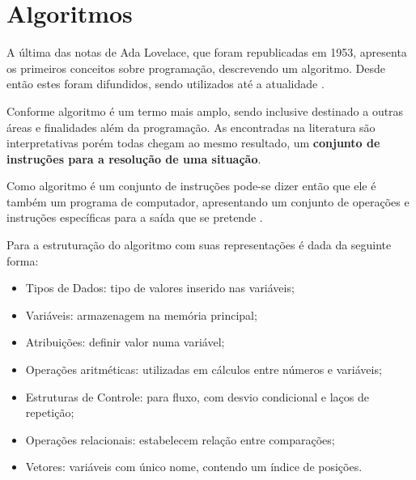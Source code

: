 \section{Algoritmos}

A última das notas de Ada Lovelace, que foram republicadas em 1953\nocite{1253887}, apresenta os
primeiros conceitos sobre programação, descrevendo um algoritmo. Desde então
estes foram difundidos, sendo utilizados até a atualidade
\cite{santiago2003etal}.

Conforme  algoritmo é um termo mais amplo, sendo inclusive destinado a outras áreas e finalidades além da programação. As encontradas na literatura são interpretativas porém todas chegam ao mesmo resultado, um {\bfseries conjunto de instruções para a resolução de uma situação}.

Como algoritmo é um conjunto de instruções pode-se dizer então que ele é também um programa de computador, apresentando um conjunto de operações e instruções específicas para a saída que se pretende \cite{medina2006etal}.



Para  a estruturação do algoritmo com suas representações é dada da seguinte forma:

\begin{itemize}

\item Tipos de Dados: tipo de valores inserido nas variáveis;
\item Variáveis: armazenagem na memória principal;
\item Atribuições: definir valor numa variável;
\item Operações aritméticas: utilizadas em cálculos entre números e variáveis;
\item Estruturas de Controle: para fluxo, com desvio condicional e laços de repetição;
\item Operações relacionais: estabelecem relação entre comparações;
\item Vetores: variáveis com único nome, contendo um índice de posições.

\end{itemize}

